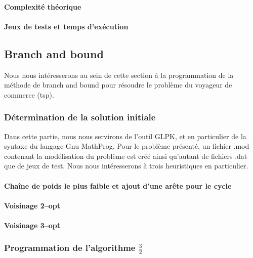 \documentclass[a4paper, 12pt]{article}
\begin{document}
\paragraph{Complexité théorique}

\paragraph{Jeux de tests et temps d'exécution}



\pagebreak

\subsection{Branch and bound}


Nous nous intéresserons au sein de cette section à la programmation de
la méthode de branch and bound pour résoudre le problème du voyageur
de commerce (tsp).

\subsubsection{Détermination de la solution initiale}

Dans cette partie, nous nous servirons de l'outil GLPK, et en
particulier de la syntaxe du langage Gnu MathProg. Pour le problème
présenté, un fichier .mod contenant la modélisation du problème est
créé ainsi qu'autant de fichiers .dat que de jeux de test. Nous nous
intéresserons à trois heuristiques en particulier.

\paragraph{Chaîne de poids le plus faible et ajout d'une arête pour le
  cycle}


\paragraph{Voisinage 2--opt}

\paragraph{Voisinage 3--opt}

\subsubsection{Programmation de l'algorithme $\frac{3}{2}$}
\end{document}
